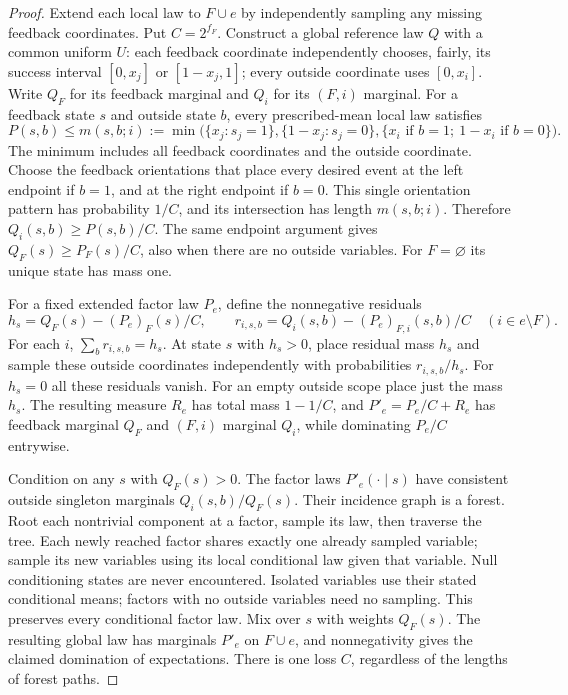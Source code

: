 \begin{proof}
Extend each local law to $F\cup e$ by independently sampling any missing
feedback coordinates. Put $C=2^{f_F}$. Construct a global reference law
$Q$ with a common uniform $U$: each feedback coordinate independently
chooses, fairly, its success interval $[0,x_j]$ or $[1-x_j,1]$;
every outside coordinate uses $[0,x_i]$. Write $Q_F$ for its feedback
marginal and $Q_i$ for its $(F,i)$ marginal. For a feedback state $s$
and outside state $b$, every prescribed-mean local law satisfies
\[
 P(s,b)\le m(s,b;i):=\min\bigl(\{x_j:s_j=1\},
 \{1-x_j:s_j=0\},\{x_i\text{ if }b=1;\ 1-x_i\text{ if }b=0\}\bigr).
\]
The minimum includes all feedback coordinates and the outside coordinate.
Choose the feedback orientations that place every desired event at the
left endpoint if $b=1$, and at the right endpoint if $b=0$. This single
orientation pattern has probability $1/C$, and its intersection has
length $m(s,b;i)$. Therefore $Q_i(s,b)\ge P(s,b)/C$.
The same endpoint argument gives $Q_F(s)\ge P_F(s)/C$, also when there
are no outside variables. For $F=\varnothing$ its unique state has mass
one.

For a fixed extended factor law $P_e$, define the nonnegative residuals
\[
 h_s=Q_F(s)-(P_e)_F(s)/C,\qquad
 r_{i,s,b}=Q_i(s,b)-(P_e)_{F,i}(s,b)/C\quad(i\in e\setminus F).
\]
For each $i$, $\sum_b r_{i,s,b}=h_s$. At state $s$ with $h_s>0$, place
residual mass $h_s$ and sample these outside coordinates independently
with probabilities $r_{i,s,b}/h_s$. For $h_s=0$ all these residuals
vanish. For an empty outside scope place just the mass $h_s$.
The resulting measure $R_e$ has total mass $1-1/C$, and
$P'_e=P_e/C+R_e$ has feedback marginal $Q_F$ and $(F,i)$ marginal $Q_i$,
while dominating $P_e/C$ entrywise.

Condition on any $s$ with $Q_F(s)>0$. The factor laws $P'_e(\cdot\mid s)$
have consistent outside singleton marginals $Q_i(s,b)/Q_F(s)$. Their
incidence graph is a forest. Root each nontrivial component at a factor,
sample its law, then traverse the tree. Each newly reached factor shares
exactly one already sampled variable; sample its new variables using its
local conditional law given that variable. Null conditioning states are
never encountered. Isolated variables use their stated conditional means;
factors with no outside variables need no sampling. This preserves every
conditional factor law. Mix over $s$ with weights $Q_F(s)$. The resulting
global law has marginals $P'_e$ on $F\cup e$, and nonnegativity gives
the claimed domination of expectations. There is one loss $C$, regardless
of the lengths of forest paths.
\end{proof}

